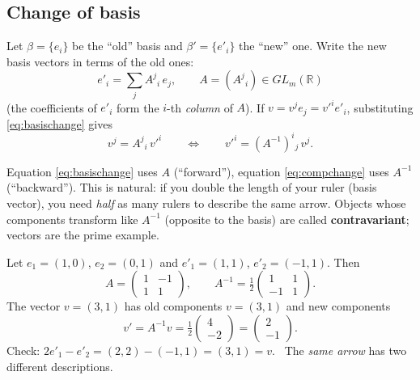 \documentclass[11pt,a4paper]{article}
\numberwithin{equation}{section}
\theoremstyle{definition}
\theoremstyle{plain}
\newcommand{\R}{\mathbb{R}}
\begin{document}
\subsection*{Change of basis}
Let $\beta=\{e_i\}$ be the ``old'' basis and $\beta'=\{e'_i\}$ the ``new'' one. Write the new basis vectors in terms of the old ones:
\begin{equation}\label{eq:basischange}
e'_i=\sum_j A^j{}_i\, e_j ,\qquad A=(A^j{}_i)\in GL_m(\R)
\end{equation}
(the coefficients of $e'_i$ form the $i$-th \emph{column} of $A$). If $v=v^je_j=v'^ie'_i$, substituting \eqref{eq:basischange} gives
\begin{equation}\label{eq:compchange}
v^j=A^j{}_i\,v'^i\qquad\Longleftrightarrow\qquad v'^i=(A^{-1})^i{}_j\,v^j .
\end{equation}

\begin{intuition}
Equation \eqref{eq:basischange} uses $A$ (``forward''), equation \eqref{eq:compchange} uses $A^{-1}$ (``backward''). This is natural: if you double the length of your ruler (basis vector), you need \emph{half} as many rulers to describe the same arrow. Objects whose components transform like $A^{-1}$ (opposite to the basis) are called \textbf{contravariant}; vectors are the prime example.
\end{intuition}

\begin{example}[{a change of basis in $\R^2$}]
Let $e_1=(1,0)$, $e_2=(0,1)$ and $e'_1=(1,1)$, $e'_2=(-1,1)$. Then
\[
A=\begin{pmatrix}1&-1\\1&1\end{pmatrix},\qquad A^{-1}=\tfrac12\begin{pmatrix}1&1\\-1&1\end{pmatrix}.
\]
The vector $v=(3,1)$ has old components $v=(3,1)$ and new components
\[
v'=A^{-1}v=\tfrac12\begin{pmatrix}4\\-2\end{pmatrix}=\begin{pmatrix}2\\-1\end{pmatrix}.
\]
Check: $2e'_1-e'_2=(2,2)-(-1,1)=(3,1)=v$. \checkmark\ The \emph{same arrow} has two different descriptions.
\end{example}
\end{document}
